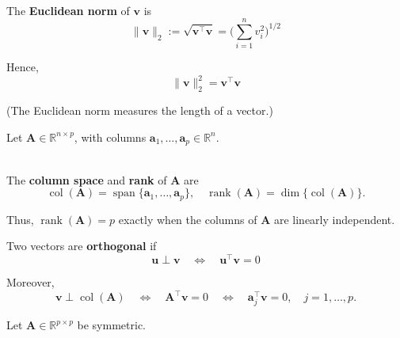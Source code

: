 \begin{definition}\leavevmode\\
    The \textbf{Euclidean norm} of $\bm{v}$ is
    \begin{equation*}
        \lVert \bm{v} \rVert_2:= \sqrt{\bm{v}^\top\bm{v}} = \Bigg( \sum_{i=1}^{n}{v_i^2}\Bigg)^{1/2}
    \end{equation*}

    Hence,
    \begin{equation*}
        \lVert \bm{v} \rVert_2^2 = \bm{v}^\top \bm{v}
    \end{equation*}

    (The Euclidean norm measures the length of a vector.)
\end{definition}

\noindent
Let $\bm{A} \in \mathbb{R}^{n \times p}$, with columns $\bm{a}_1,\dots,\bm{a}_p \in \mathbb{R}^n$.

\begin{definition} \leavevmode\\
    The \textbf{column space} and \textbf{rank} of $\bm{A}$ are
    \begin{equation*}
        \operatorname{col}(\bm{A}) = \operatorname{span}\{\bm{a}_1,\dots,\bm{a}_p\}, \quad
        \operatorname{rank}(\bm{A})=\operatorname{dim}\{\operatorname{col}(\bm{A})\}.
    \end{equation*}

    Thus, $\operatorname{rank}(\bm{A}) = p$ exactly when the columns of $\bm{A}$ are linearly independent.
\end{definition}

\begin{definition}[Orthogonality]
    Two vectors are \textbf{orthogonal} if
    \begin{equation*}
        \bm{u}\perp \bm{v} \quad 
        \Longleftrightarrow \quad
        \bm{u}^{\top}\bm{v}=0
    \end{equation*}

    Moreover,
    \begin{equation*}
        \bm{v} \perp \operatorname{col}(\bm{A}) \quad
        \Longleftrightarrow \quad
        \bm{A}^\top\bm{v}=0 \quad
        \Longleftrightarrow \quad
        \bm{a}_j^\top \bm{v} = 0, \quad j=1,\dots,p.
    \end{equation*}
\end{definition}

\noindent
Let $\bm{A} \in \mathbb{R}^{p \times p}$ be symmetric.

